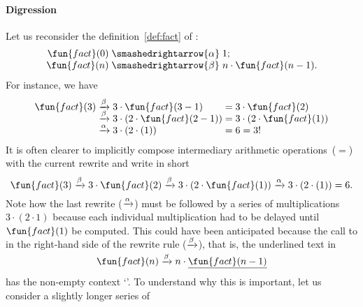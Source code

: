 \paragraph{Digression}

Let us reconsider the definition~\eqref{def:fact} of
 :
\begin{equation*}
\begin{array}{r@{\;}l@{\;}l}
\fun{fact}(0) & \smashedrightarrow{\alpha} & 1;\\
\fun{fact}(n) & \smashedrightarrow{\beta} & n \cdot \fun{fact}(n-1).
\end{array}
\end{equation*}
For instance, we have
\begin{equation*}
\begin{array}{r@{\;}c@{\;}l@{\;}c@{\;}l}
\fun{fact}(3) & \xrightarrow{\beta} & 3 \cdot \fun{fact}(3-1)
              & = & 3 \cdot \fun{fact}(2)\\
              & \xrightarrow{\smash[t]{\beta}} &
              3 \cdot (2 \cdot \fun{fact}(2-1))
              & = & 3 \cdot (2 \cdot \fun{fact}(1))\\
              & \xrightarrow{\smash[t]{\alpha}} &
                3 \cdot (2 \cdot (1)) & = & 6 = 3!
\end{array}
\end{equation*}
It is often clearer to implicitly compose intermediary arithmetic
operations~(\(=\)) with the current rewrite and write in short
\begin{equation*}
\fun{fact}(3) \xrightarrow{\beta} 3 \cdot \fun{fact}(2)
\xrightarrow{\smash[t]{\beta}} 3 \cdot (2 \cdot \fun{fact}(1))
\xrightarrow{\smash[t]{\alpha}} 3 \cdot (2 \cdot (1)) = 6.
\end{equation*}
Note how the last rewrite (\(\xrightarrow{\smash[t]{\alpha}}\)) must
be followed by a series of multiplications~\(3 \cdot (2 \cdot 1)\)
because each individual multiplication had to be delayed until
\(\fun{fact}(1)\) be computed. This could have been anticipated
because the call to  in the right\hyp{}hand side of the
rewrite rule (\(\xrightarrow{\smash[t]{\beta}}\)), that is, the
underlined text in
\begin{equation*}
\fun{fact}(n) \xrightarrow{\smash[t]{\beta}} n \cdot \underline{\fun{fact}(n-1)}
\end{equation*}
has the non\hyp{}empty context
`'. To understand why this is
important, let us consider a slightly longer series of
